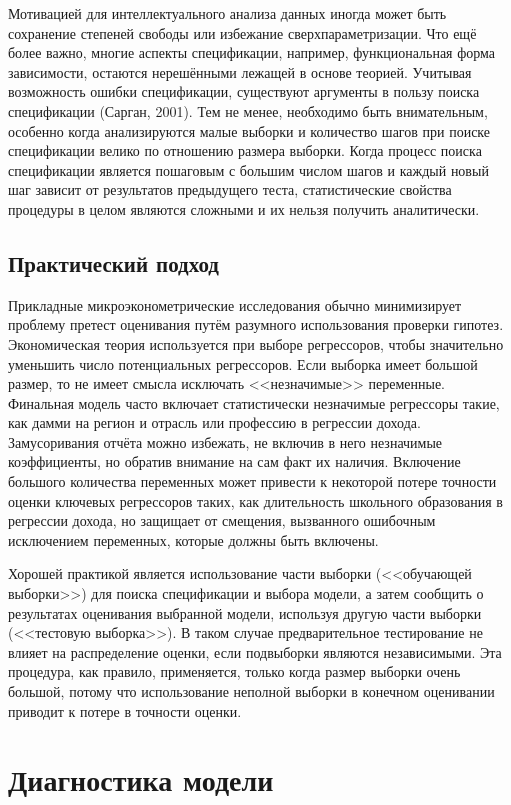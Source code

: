 Мотивацией для интеллектуального анализа данных иногда может быть сохранение степеней свободы или избежание сверхпараметризации. Что ещё более важно, многие аспекты спецификации, например, функциональная форма зависимости, остаются нерешёнными лежащей в основе теорией. Учитывая возможность ошибки спецификации,  существуют аргументы в пользу поиска спецификации (Сарган, 2001). Тем не менее, необходимо быть внимательным, особенно когда анализируются малые выборки и количество шагов при поиске спецификации велико по отношению размера выборки. Когда процесс поиска спецификации является пошаговым с большим числом шагов и каждый новый шаг зависит от результатов предыдущего теста, статистические свойства процедуры в целом являются сложными и их нельзя получить аналитически.

\subsection{Практический подход}

Прикладные микроэконометрические исследования обычно минимизирует проблему претест оценивания путём разумного использования проверки гипотез. Экономическая теория используется при выборе регрессоров, чтобы значительно уменьшить число потенциальных регрессоров. Если выборка имеет большой размер, то не имеет смысла исключать <<незначимые>> переменные. Финальная модель часто включает статистически незначимые регрессоры такие, как дамми на регион и отрасль  или профессию в регрессии дохода. Замусоривания отчёта можно избежать, не включив в него незначимые коэффициенты, но обратив внимание на сам факт их наличия.  Включение большого количества переменных может привести к некоторой потере точности оценки ключевых регрессоров таких, как длительность школьного образования в регрессии дохода, но защищает от смещения, вызванного ошибочным исключением переменных, которые должны быть включены.

Хорошей практикой является использование части выборки (<<обучающей выборки>>) для поиска спецификации и выбора модели, а затем сообщить о результатах оценивания выбранной модели, используя другую части выборки (<<тестовую выборка>>). В таком случае предварительное тестирование не влияет на распределение оценки, если подвыборки являются независимыми. Эта процедура, как правило, применяется, только когда размер выборки очень большой, потому что использование неполной выборки в конечном оценивании приводит к потере в точности оценки.

\section{Диагностика модели}


